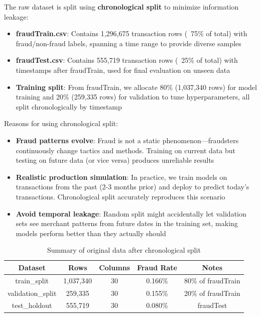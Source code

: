 The raw dataset is split using \textbf{chronological split} to minimize information leakage:
\begin{itemize}
    \item \textbf{fraudTrain.csv}: Contains 1,296,675 transaction rows (~75\% of total) with fraud/non-fraud labels, spanning a time range to provide diverse samples
    \item \textbf{fraudTest.csv}: Contains 555,719 transaction rows (~25\% of total) with timestamps after fraudTrain, used for final evaluation on unseen data
    \item \textbf{Training split}: From fraudTrain, we allocate 80\% (1,037,340 rows) for model training and 20\% (259,335 rows) for validation to tune hyperparameters, all split chronologically by timestamp
\end{itemize}

Reasons for using chronological split:
\begin{itemize}
    \item \textbf{Fraud patterns evolve}: Fraud is not a static phenomenon---fraudsters continuously change tactics and methods. Training on current data but testing on future data (or vice versa) produces unreliable results
    \item \textbf{Realistic production simulation}: In practice, we train models on transactions from the past (2-3 months prior) and deploy to predict today's transactions. Chronological split accurately reproduces this scenario
    \item \textbf{Avoid temporal leakage}: Random split might accidentally let validation sets see merchant patterns from future dates in the training set, making models perform better than they actually should
\end{itemize}

\begin{table}[h]
\centering
\caption{Summary of original data after chronological split}
\begin{tabular}{|c|c|c|c|c|}
\hline
\textbf{Dataset} & \textbf{Rows} & \textbf{Columns} & \textbf{Fraud Rate} & \textbf{Notes} \\
\hline
train\_split & 1,037,340 & 30 & 0.166\% & 80\% of fraudTrain \\
\hline
validation\_split & 259,335 & 30 & 0.155\% & 20\% of fraudTrain \\
\hline
test\_holdout & 555,719 & 30 & 0.080\% & fraudTest \\
\hline
\end{tabular}
\end{table}


